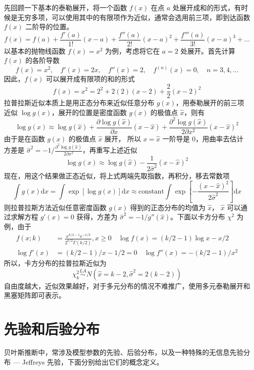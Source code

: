 \documentclass[12pt,a4paper,UTF8,twoside]{book}
\theoremstyle{definition}
\theoremstyle{definition}
\theoremstyle{definition}
\theoremstyle{remark}
\begin{document}
先回顾一下基本的泰勒展开，将一个函数 \(f(x)\) 在点 \(a\)
处展开成和的形式，有时候是无穷多项，可以使用其中的有限项作为近似，通常会选用前三项，即到达函数
\(f(x)\) 二阶导的位置。
\[ f(x) = f(a) + \frac{f'(a)}{1!}(x-a) + \frac{f''(a)}{2!}(x-a)^2 + \frac{f'''(a)}{3!}(x-a)^3 + \ldots \]
\noindent 以基本的抛物线函数 \(f(x) = x^2\) 为例，考虑将它在 \(a = 2\)
处展开。首先计算 \(f(x)\) 的各阶导数
\[ f(x) = x^2, \quad f'(x) = 2x, \quad f''(x) = 2, \quad f^{(n)}(x) = 0, \quad n = 3,4,\ldots \]
\noindent 因此，\(f(x)\) 可以展开成有限项的和的形式
\[ f(x) = x^2 = 2^2 + 2(2)(x-2) + \frac{2}{2}(x-2)^2 \]
拉普拉斯近似本质上是用正态分布来近似任意分布
\(g(x)\)，用泰勒展开的前三项近似 \(\log g(x)\)，展开的位置是密度函数
\(g(x)\) 的极值点 \(\hat{x}\)，则有
\[ \log g(x) \approx \log g(\hat{x}) + \frac{\partial \log g(\hat{x})}{\partial x} (x - \hat{x}) + \frac{\partial^2 \log g(\hat{x})}{2\partial x^2} (x - \hat{x})^2 \]
\noindent 由于是在函数 \(g(x)\) 的极值点 \(\hat{x}\) 展开， 所以
\(x = \hat{x}\) 一阶导是 0，用曲率去估计方差是
\(\hat{\sigma}^2 = -1/\frac{\partial^2 \log g(\hat{x})}{2\partial x^2}\)，再重写上述近似
\[ \log g(x) \approx \log g(\hat{x}) - \frac{1}{2\hat{\sigma}^2} (x - \hat{x})^2 \]
\noindent 现在，用这个结果做正态近似，将上式两端先取指数，再积分，移去常数项
\[ \int g(x) \mathrm{d}x = \int \exp[\log g(x)] \mathrm{d}x \approx \mathrm{constant} \int \exp[- \frac{(x - \hat{x})^2}{2\hat{\sigma}^2}] \mathrm{d}x \]
\noindent 则拉普拉斯方法近似任意密度函数 \(g(x)\) 得到的正态分布的均值为
\(\hat{x}\)， \(\hat{x}\) 可以通过求解方程 \(g'(x) = 0\) 获得，方差为
\(\hat{\sigma}^2 = -1/g''(\hat{x})\)。下面以卡方分布 \(\chi^2\)
为例，由于 \begin{align*}
    f(x; k) & = \frac{ x^{k/2-1} \mathrm{e}^{-x/2} }{ 2^{k/2}\Gamma(k/2) }, x \geq 0 \quad \log f(x) = (k/2 - 1) \log x - x/2 \\
 \log f'(x) & = (k/2-1)/x - 1/2 = 0 \quad \log f''(x)  = -(k/2-1)/x^2
\end{align*} \noindent 所以，卡方分布的拉普拉斯近似为
\[ \chi_{k}^2 \overset{LA}{\sim}  N(\hat{x} = k-2, \hat{\sigma}^2 = 2(k-2)) \]
\noindent 自由度越大，近似效果越好，对于多元分布的情况不难推广，使用多元泰勒展开和黑塞矩阵即可表示\citep{Tierney1986}。

\hypertarget{sec:bayes-prior}{%
\section{先验和后验分布}\label{sec:bayes-prior}}

贝叶斯推断中，常涉及模型参数的先验、后验分布，以及一种特殊的无信息先验分布
--- Jeffreys 先验，下面分别给出它们的概念定义。
\end{document}
